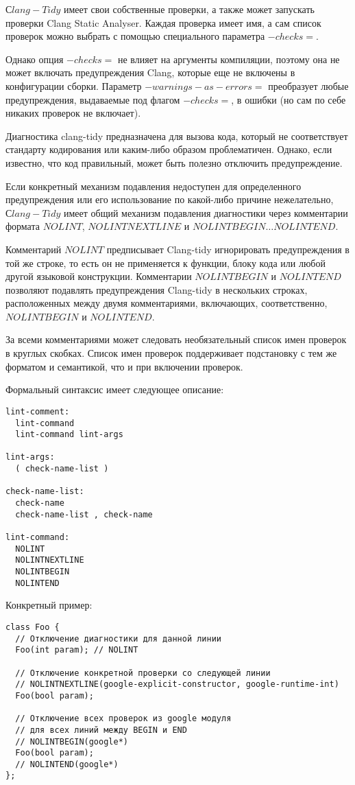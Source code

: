 \documentclass{mipt-thesis-bs}
\begin{document}
$Сlang-Tidy$ имеет свои собственные проверки, а также может запускать 
проверки Clang Static Analyser. Каждая проверка имеет имя, 
а сам список проверок можно выбрать с помощью специального параметра $-checks=$.

Однако опция $-checks=$ не влияет на аргументы компиляции, поэтому она 
не может включать предупреждения Clang, которые еще не включены в 
конфигурации сборки. Параметр $-warnings-as-errors=$ преобразует 
любые предупреждения, выдаваемые под флагом $-checks=$, в ошибки 
(но сам по себе никаких проверок не включает).

Диагностика clang-tidy предназначена для вызова кода, который не 
соответствует стандарту кодирования или каким-либо образом проблематичен. 
Однако, если известно, что код правильный, может быть полезно отключить предупреждение.

Если конкретный механизм подавления недоступен для определенного 
предупреждения или его использование по какой-либо причине 
нежелательно, $Сlang-Tidy$ имеет общий механизм подавления 
диагностики через комментарии формата $NOLINT$,
$NOLINTNEXTLINE$ и $NOLINTBEGIN… NOLINTEND$.

Комментарий $NOLINT$ предписывает Clang-tidy игнорировать предупреждения 
в той же строке, то есть он не применяется к функции, блоку кода или любой 
другой языковой конструкции.
Комментарии $NOLINTBEGIN$ и $NOLINTEND$ позволяют подавлять предупреждения 
Clang-tidy в нескольких строках, расположенных между двумя 
комментариями, включающих, соответственно, $NOLINTBEGIN$ и $NOLINTEND$.

За всеми комментариями может следовать необязательный список имен 
проверок в круглых скобках. 
Список имен проверок поддерживает подстановку с тем же форматом 
и семантикой, что и при включении проверок.

Формальный синтаксис имеет следующее описание:
\begin{verbatim}
lint-comment:
  lint-command
  lint-command lint-args

lint-args:
  ( check-name-list )

check-name-list:
  check-name
  check-name-list , check-name

lint-command:
  NOLINT
  NOLINTNEXTLINE
  NOLINTBEGIN
  NOLINTEND
\end{verbatim}

Конкретный пример:
\begin{verbatim}
class Foo {
  // Отключение диагностики для данной линии
  Foo(int param); // NOLINT

  // Отключение конкретной проверки со следующей линии
  // NOLINTNEXTLINE(google-explicit-constructor, google-runtime-int)
  Foo(bool param);

  // Отключение всех проверок из google модуля
  // для всех линий между BEGIN и END
  // NOLINTBEGIN(google*)
  Foo(bool param);
  // NOLINTEND(google*)
};
\end{verbatim}
\end{document}
